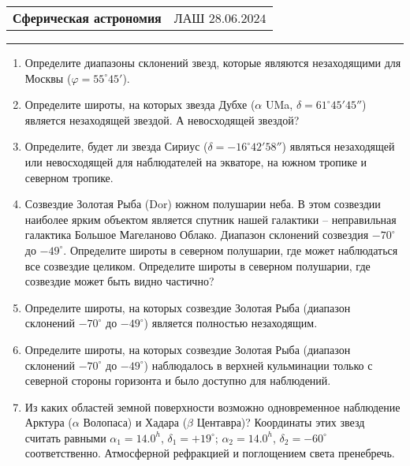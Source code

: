 \documentclass[12pt]{article}
\begin{document}
\begin{tabularx}{\textwidth}{Xr}
{\Large \textbf{Сферическая астрономия}} & ЛАШ $28.06.2024$ \\
\end{tabularx}
\noindent\rule{\textwidth}{0.4pt}
\begin{enumerate}
    \subsection*{Невосходящие/незаходящие звезды}
    \item Определите диапазоны склонений звезд, которые являются незаходящими для Москвы ($\varphi=55^{\circ}45'$).
    \item Определите широты, на которых звезда Дубхе ($\alpha$ UMa, $\delta = 61^{\circ}45'45''$) является незаходящей звездой. А невосходящей звездой?
    \item Определите, будет ли звезда Сириус ($\delta=-16^{\circ}42'58''$) являться незаходящей или невосходящей для наблюдателей на экваторе, на южном тропике и северном тропике.
    \item Созвездие Золотая Рыба (Dor) южном полушарии неба. В этом созвездии наиболее ярким объектом является спутник нашей галактики -- неправильная галактика Большое Магеланово Облако. Диапазон склонений созвездия $-70^{\circ}$ до $-49^{\circ}$. Определите широты в северном полушарии, где может наблюдаться все созвездие целиком. Определите широты в северном полушарии, где созвездие может быть видно частично?
    \item Определите широты, на которых созвездие Золотая Рыба (диапазон склонений $-70^{\circ}$ до $-49^{\circ}$) является полностью незаходящим. 
    \item Определите широты, на которых созвездие Золотая Рыба (диапазон склонений $-70^{\circ}$ до $-49^{\circ}$) наблюдалось в верхней кульминации только с северной стороны горизонта и было доступно для наблюдений.
    \item Из каких областей земной поверхности возможно одновременное наблюдение Арктура ($\alpha$ Волопаса) и Хадара ($\beta$ Центавра)?  Координаты этих звезд считать равными $\alpha_{1}=14.0^{h}$, $\delta_{1}=+19^{\circ}$; $\alpha_{2}=14.0^h$, $\delta_{2}=-60^{\circ}$ соответственно. Атмосферной рефракцией и поглощением света пренебречь.

\end{enumerate}
\end{document}

